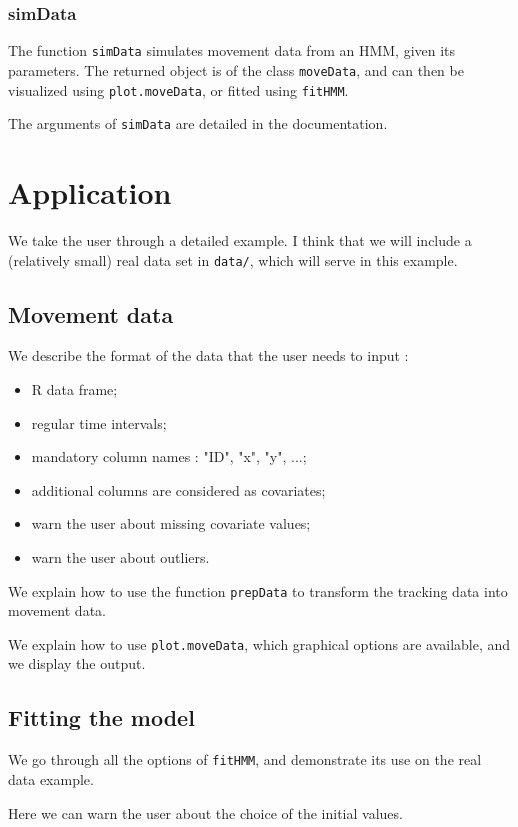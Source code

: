 \documentclass[]{article}
\begin{document}
\subsubsection{simData}
The function \texttt{simData} simulates movement data from an HMM, given its parameters. The returned object is of the class \texttt{moveData}, and can then be visualized using \texttt{plot.moveData}, or fitted using \texttt{fitHMM}.

The arguments of \texttt{simData} are detailed in the documentation.

\section{Application} \label{application}
We take the user through a detailed example. I think that we will include a (relatively small) real data set in \texttt{data/}, which will serve in this example.

\subsection{Movement data}
We describe the format of the data that the user needs to input :
\begin{itemize}
	\item R data frame;
	\item regular time intervals;
	\item mandatory column names : "ID", "x", "y", ...;
	\item additional columns are considered as covariates;
	\item warn the user about missing covariate values;
	\item warn the user about outliers.
\end{itemize}

We explain how to use the function \texttt{prepData} to transform the tracking data into movement data.

We explain how to use \texttt{plot.moveData}, which graphical options are available, and we display the output.

\subsection{Fitting the model}
We go through all the options of \texttt{fitHMM}, and demonstrate its use on the real data example.

Here we can warn the user about the choice of the initial values.
\end{document}
